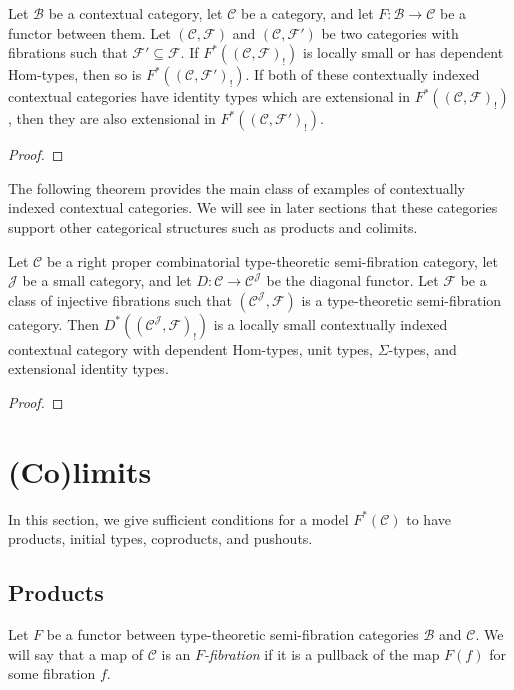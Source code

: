 \documentclass[reqno]{amsart}
\theoremstyle{definition}
\theoremstyle{remark}
\newcommand{\fs}[1]{\mathrm{#1}}
\newcommand{\scat}[1]{\mathcal{#1}}
\newcommand{\Fib}{\mathcal{F}}
\newcommand{\Hom}{\fs{Hom}}
\numberwithin{figure}{section}
\begin{document}
\begin{prop}
Let $\scat{B}$ be a contextual category, let $\scat{C}$ be a category, and let $F : \scat{B} \to \scat{C}$ be a functor between them.
Let $(\scat{C},\Fib)$ and $(\scat{C},\Fib')$ be two categories with fibrations such that $\Fib' \subseteq \Fib$.
If $F^*((\scat{C},\Fib)_!)$ is locally small or has dependent $\Hom$-types, then so is $F^*((\scat{C},\Fib')_!)$.
If both of these contextually indexed contextual categories have identity types which are extensional in $F^*((\scat{C},\Fib)_!)$, then they are also extensional in $F^*((\scat{C},\Fib')_!)$.
\end{prop}
\begin{proof}
\end{proof}

The following theorem provides the main class of examples of contextually indexed contextual categories.
We will see in later sections that these categories support other categorical structures such as products and colimits.

\begin{thm}
Let $\scat{C}$ be a right proper combinatorial type-theoretic semi-fibration category, let $\scat{J}$ be a small category, and let $D : \scat{C} \to \scat{C}^\scat{J}$ be the diagonal functor.
Let $\Fib$ be a class of injective fibrations such that $(\scat{C}^\scat{J},\Fib)$ is a type-theoretic semi-fibration category.
Then $D^*((\scat{C}^\scat{J},\Fib)_!)$ is a locally small contextually indexed contextual category with dependent $\Hom$-types, unit types, $\Sigma$-types, and extensional identity types.
\end{thm}
\begin{proof}
\end{proof}

\section{(Co)limits}

In this section, we give sufficient conditions for a model $F^*(\scat{C})$ to have products, initial types, coproducts, and pushouts.

\subsection{Products}

Let $F$ be a functor between type-theoretic semi-fibration categories $\scat{B}$ and $\scat{C}$.
We will say that a map of $\scat{C}$ is an \emph{$F$-fibration} if it is a pullback of the map $F(f)$ for some fibration $f$.
\end{document}
